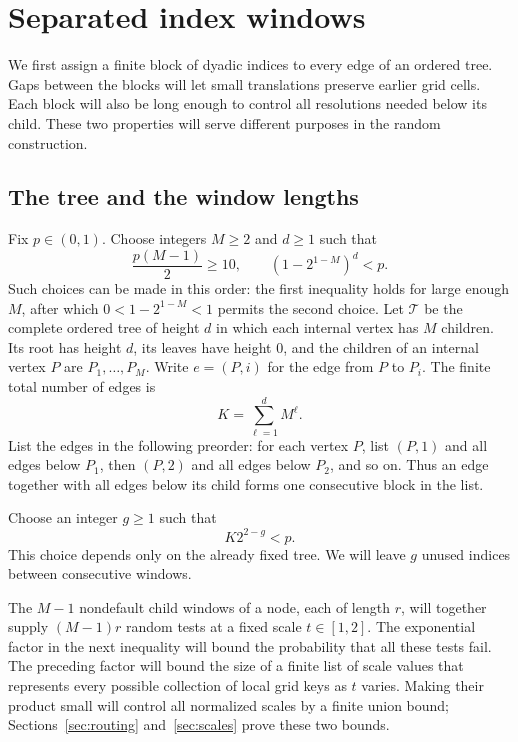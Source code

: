 \section{Separated index windows}\label{sec:windows}

We first assign a finite block of dyadic indices to every edge of an
ordered tree.  Gaps between the blocks will let small translations
preserve earlier grid cells.  Each block will also be long enough to
control all resolutions needed below its child.  These two properties
will serve different purposes in the random construction.

\subsection{The tree and the window lengths}

Fix $p\in(0,1)$.  Choose integers $M\ge2$ and $d\ge1$ such that
\begin{equation}
 \frac{p(M-1)}2\ge10,
 \qquad
 (1-2^{1-M})^d<p.
 \label{eq:tree-parameters}
\end{equation}
Such choices can be made in this order: the first inequality holds for
large enough $M$, after which $0<1-2^{1-M}<1$ permits the second choice.
Let $\mathcal T$ be the complete ordered tree of height $d$ in which each
internal vertex has $M$ children.  Its root has height $d$, its leaves
have height $0$, and the children of an internal vertex $P$ are
$P_1,\ldots,P_M$.  Write $e=(P,i)$ for the edge from $P$ to $P_i$.
The finite total number of edges is
\[
 K=\sum_{\ell=1}^d M^\ell.
\]
List the edges in the following preorder: for each vertex $P$, list
$(P,1)$ and all edges below $P_1$, then $(P,2)$ and all edges below
$P_2$, and so on.  Thus an edge together with all edges below its child
forms one consecutive block in the list.

Choose an integer $g\ge1$ such that
\begin{equation}
 K2^{2-g}<p.
 \label{eq:gap-budget}
\end{equation}
This choice depends only on the already fixed tree.  We will leave $g$
unused indices between consecutive windows.

The $M-1$ nondefault child windows of a node, each of length $r$, will
together supply $(M-1)r$ random tests at a fixed scale $t\in[1,2]$.
The exponential factor in the next inequality will bound
the probability that all these tests fail. The preceding factor will
bound the size of a finite list of scale values that represents every
possible collection of local grid keys as $t$ varies. Making their
product small will control all normalized scales by a finite union
bound; Sections~\ref{sec:routing} and~\ref{sec:scales} prove these two
bounds.

